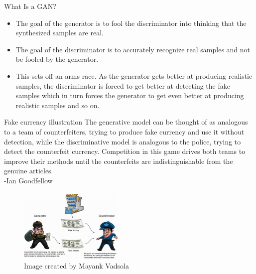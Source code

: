     \begin{frame} {What Is a GAN?}
\begin{figure}
\centering
{}
\end{figure}
\begin{itemize}
\item The goal of the generator is to fool the discriminator into thinking that the synthesized samples are real.
\item The goal of the discriminator is to accurately recognize real samples and not be fooled by the generator.
\item This sets off an arms race. As the generator gets better at producing realistic samples, the discriminator is forced to get better at detecting the fake samples which in turn forces the generator to get even better at producing realistic samples and so on.
\end{itemize}
\end{frame}

\begin{frame} {Fake currency illustration}
\vspace{1mm}
The generative model can be thought of as analogous to a team of counterfeiters, trying to produce fake currency and use it without detection, while the discriminative model is analogous to the police, trying to detect the counterfeit currency. Competition in this game drives both teams to improve their methods until the counterfeits are indistinguishable from the genuine articles. \\
\hspace{45mm} -Ian Goodfellow

\begin{figure}
\includegraphics[width=5cm]{plots/counterfeiters.png}
\tiny{\\Image created by Mayank Vadsola}
\end{figure}

\end{frame}



